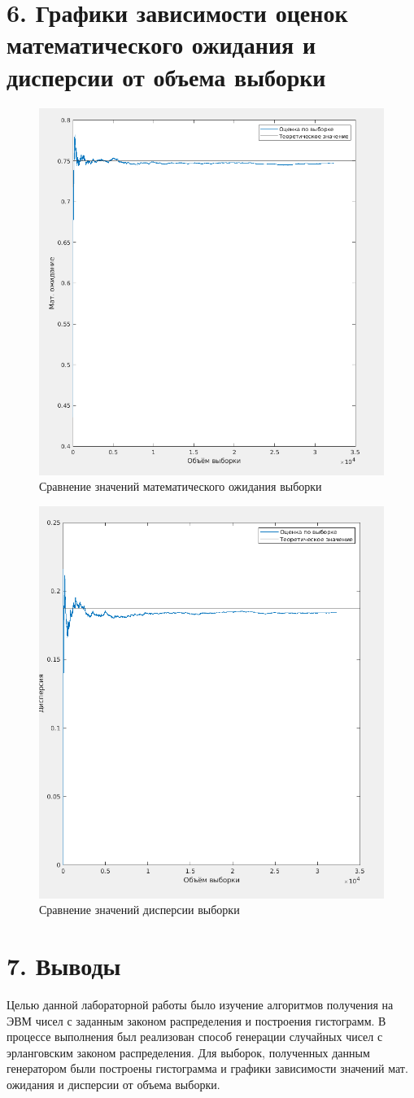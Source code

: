 \documentclass[12pt]{article}
\begin{document}
\newpage
 \section*{6. Графики зависимости оценок математического ожидания и дисперсии от объема выборки}
 
\begin{figure}[!h]
	\centering
	\includegraphics[width=0.5\linewidth]{mean_graph.png}
	\caption{Сравнение значений математического ожидания выборки}
\end{figure}

\begin{figure}[!h]
	\centering
	\includegraphics[width=0.5\linewidth]{disp_graph.png}
	\caption{Сравнение значений дисперсии выборки}
\end{figure}

\newpage
 \section*{7. Выводы}
Целью данной лабораторной работы было изучение алгоритмов получения на ЭВМ чисел с заданным законом распределения и построения гистограмм.
В процессе выполнения был реализован способ генерации случайных чисел с эрланговским законом распределения.
Для выборок, полученных данным генератором были построены гистограмма и графики зависимости значений мат. ожидания и дисперсии от объема выборки.
\end{document}

